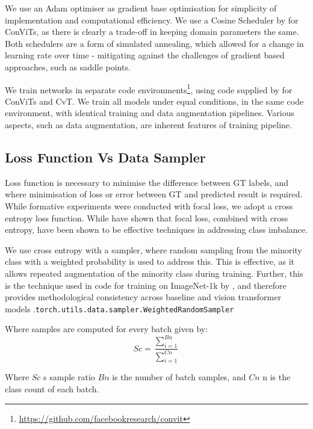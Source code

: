 We use an Adam optimiser\cite{Kingma2015} as gradient base optimisation for simplicity of implementation and computational efficiency. We use a Cosine Scheduler by \cite{DAscoli2021} for ConViTs, as there is clearly a trade-off in keeping domain parameters the same. Both schedulers are a form of simulated annealing, which allowed for a change in learning rate over time - mitigating against the challenges of gradient based approaches, such as saddle points. 

We train networks in separate code environments\footnote{\href{https://github.com/facebookresearch/convit}{https://github.com/facebookresearch/convit}}, using code supplied by \cite{DAscoli2021} for ConViTs and CvT. We train all models under equal conditions, in the same code environment, with identical training and data augmentation pipelines. Various aspects, such as data augmentation, are inherent features of training pipeline.

\subsection{Loss Function Vs Data Sampler}

Loss function is necessary to minimise the difference between GT labels, and where minimisation of loss or error between GT and predicted result is required.  While formative experiments were conducted with focal loss, we adopt a cross entropy loss function. While \cite{Lin2020} have shown that focal loss, combined with cross entropy, have been shown to be effective techniques in addressing class imbalance. 

We use cross entropy with a sampler, where random sampling from the minority class with a weighted probability is used to address this. This is effective, as it allows repeated augmentation of the minority class during training. Further, this is the technique used in code for training on ImageNet-1k by \cite{Touvron2020a, DAscoli2021}, and therefore provides methodological consistency across baseline and vision transformer models .\lstinline[language=Python]{torch.utils.data.sampler.WeightedRandomSampler}

Where samples are computed for every batch given by:
\begin{equation}
    Sc = \frac{\sum_{i=1}^{Bn}}{\sum_{i=1}^{Cn}}
    \label{eq:class weights} 
\end{equation}

Where $Sc$ s sample ratio $Bn$ is the number of batch samples, and $Cn$ n is the class count of each batch.

